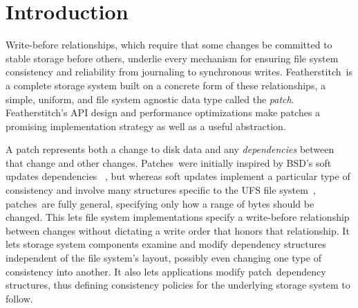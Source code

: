 \documentclass[9pt,twocolumn,letterpaper]{article}
\newcommand{\Kudos}{Featherstitch}
\newcommand{\Featherstitch}{\Kudos}
\newcommand{\patch}{patch}
\newcommand{\patches}{patches}
\newcommand{\Patches}{Patches}
\newcommand{\patchgroups}{patchgroups}
\begin{document}
\section {Introduction}
\label{sec:intro}

\begin{comment}
This paper aims to evaluate whether a simple, unified abstraction that
represents all modifications to stable storage, including
\emph{dependencies} among modifications, can be used to efficiently
implement a complete file system layer, where modifications are common
and cache sizes are large.
%
The answer is a qualified yes.
\end{comment}


Write-before relationships, which require that some changes be committed
 to stable storage before others, underlie every mechanism for ensuring file system
 consistency and reliability from journaling to synchronous writes.
%
\Featherstitch\ is a complete storage system
 built on a concrete form of these relationships,
 a simple, uniform, and file system agnostic data type called the \emph{patch}.
%
\Kudos's API design and performance optimizations make patches
 a promising implementation strategy as well as a useful abstraction.


\begin{comment}
As file system functionality increases, maintaining file system
 correctness in the presence of failures is increasingly a focus of
 research~\cite{sivathanuetal05-logic,denehyetal05-journal-guided}.
%
File systems today deal with many challenges that make implementing this
 property difficult: power losses, software failures, and even user
 intervention all pose significant threats.
%
To meet this challenge, file systems use a variety of techniques, like
 journaling and soft updates.
%
These mechanisms are each based on imposing some write-before
 relationship among buffered changes to the data in stable storage.
%
The answer is a qualified yes.
\end{comment}


A patch represents both a change to disk data and any \emph{dependencies}
 between that change and other changes. 
%
\Patches\ were initially inspired by BSD's soft updates dependencies%
~\cite{ganger00soft}, but whereas soft updates
 implement a particular type of consistency
 and involve many structures specific to the UFS file
 system~\cite{mckusick99soft}, \patches\ are fully general,
 specifying only how a range of bytes should be changed.
%
This lets file system implementations specify a
 write-before relationship between changes without dictating
 a write order that honors that relationship.
%
It lets storage system components examine and
 modify dependency structures independent of the file system's layout,
 possibly even changing one type of consistency into another.
%
It also lets applications modify \patch\ dependency structures,
 thus defining consistency policies for the underlying
 storage system to follow.
\end{document}
